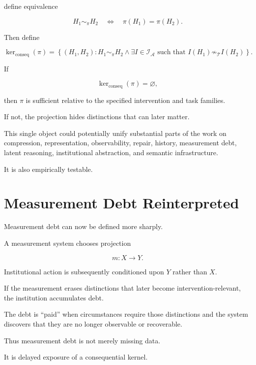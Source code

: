 \documentclass[11pt]{article}
\theoremstyle{remark}
\newcommand{\Adm}{\mathcal{A}}
\begin{document}
define equivalence

\begin{equation}
H_1\sim_\pi H_2
\quad\Longleftrightarrow\quad
\pi(H_1)=\pi(H_2).
\end{equation}

Then define

\begin{equation}
\ker_{\mathrm{conseq}}(\pi)
=
\left\{
(H_1,H_2):
H_1\sim_\pi H_2
\land
\exists I\in\mathcal{I}_{\Adm}
\text{ such that }
I(H_1)\not\sim_{\mathcal{T}}I(H_2)
\right\}.
\end{equation}

If

\begin{equation}
\ker_{\mathrm{conseq}}(\pi)=\varnothing,
\end{equation}

then $\pi$ is sufficient relative to the specified intervention and task families.

If not, the projection hides distinctions that can later matter.

This single object could potentially unify substantial parts of the work on compression, representation, observability, repair, history, measurement debt, latent reasoning, institutional abstraction, and semantic infrastructure.

It is also empirically testable.

\section{Measurement Debt Reinterpreted}

Measurement debt can now be defined more sharply.

A measurement system chooses projection

\begin{equation}
m:X\rightarrow Y.
\end{equation}

Institutional action is subsequently conditioned upon $Y$ rather than $X$.

If the measurement erases distinctions that later become intervention-relevant, the institution accumulates debt.

The debt is ``paid'' when circumstances require those distinctions and the system discovers that they are no longer observable or recoverable.

Thus measurement debt is not merely missing data.

It is delayed exposure of a consequential kernel.
\end{document}
